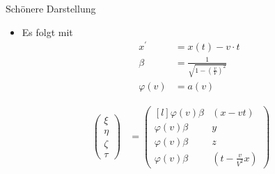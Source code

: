 \documentclass[]{beamer}%
\begin{document}
\begin{frame}{Schönere Darstellung}
    \begin{itemize}
        \item Es folgt mit
            \begin{align*}
                x^\prime                &= x(t) - v \cdot t\\
                \beta                   &=\frac{1}{\sqrt{1-\left( \frac{v}{V} \right)^2}}\\
                \varphi \left(v\right)  &= a \left(v\right)
            \end{align*}
    \end{itemize}
    \begin{align*}
        \begin{pmatrix}
            \xi \\ 
            \eta \\ 
            \zeta\\ 
            \tau 
        \end{pmatrix}
    &=
        \begin{pmatrix*}[l]
            \varphi\left(v\right)       \beta &\left(    x-vt\right)\\
            \varphi\left(v\right)       \beta &y\\
            \varphi\left(v\right)       \beta &z\\
            \varphi\left(v\right)       \beta &\left( t-\frac{v}{V^2}x \right)
        \end{pmatrix*}
    \end{align*}
\end{frame}
\end{document}
